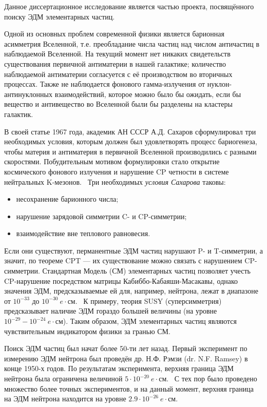 
{\actuality} 
Данное диссертационное исследование является частью проекта, посвящённого поиску ЭДМ элементарных частиц.

Одной из основных проблем современной физики является барионная асимметрия Вселенной, т.е. преобладание числа частиц над числом античастиц в наблюдаемой Вселенной. На текущий момент нет никаких свидетельств существования первичной антиматерии в нашей галактике; количество наблюдаемой антиматерии согласуется с её производством во вторичных процессах. Также не наблюдается фонового гамма-излучения от нуклон-антинуклонных взаимодействий, которое можно было бы ожидать, если бы вещество и антивещество во Вселенной были бы разделены на кластеры галактик.~\cite{Trodden:Baryogenesis} 

В своей статье 1967 года, академик АН СССР А.Д. Сахаров сформулировал три необходимых условия, которым должен был удовлетворять процесс бариогенеза, чтобы материя и антиматерия в первичной Вселенной производились с разными скоростями. Побудительным мотивом формулировки стало открытие космического фонового излучения и нарушение CP четности в системе нейтральных K-мезонов.~\cite{Fitch:Kaon-CP-violation-1964} Три необходимых \emph{условия Сахарова} таковы:
\begin{itemize}
	\item несохранение барионного числа;
	\item нарушение зарядовой симметрии C- и CP-симметрии;
	\item взаимодействие вне теплового равновесия.
\end{itemize}

Если они существуют, перманентные ЭДМ частиц нарушают P- и T-симметрии, а значит, по теореме CPT --- их существование можно связать с нарушением CP-симметрии. Стандартная Модель (СМ) элементарных частиц позволяет учесть CP-нарушение посредством матрицы Кабиббо-Кабаяши-Масакавы, однако значения ЭДМ, предсказываемые ей для, например, нейтрона, лежат в диапазоне от $10^{-33}$ до $10^{-30}~e\cdot$см.~\cite{Harris:Neutron2007} К примеру, теория SUSY (суперсимметрия) предсказывает наличие ЭДМ гораздо большей величины (на уровне $10^{-29} - 10^{-24}~e\cdot$см). Таким образом, ЭДМ элементарных частиц являются чувствительным индикатором физики за гранью СМ. 

Поиск ЭДМ частиц был начат более 50-ти лет назад. Первый эксперимент по измерению ЭДМ нейтрона был проведён др. Н.Ф. Рэмзи (dr. N.F. Ramsey) в конце 1950-х годов. По результатам эксперимента, верхняя граница ЭДМ нейтрона была ограничена величиной $5\cdot 10^{-20}~e\cdot$см.~\cite{Ramsey:Neutron1957} С тех пор было проведено множество более точных экспериментов, и на данный момент, верхняя граница на ЭДМ нейтрона находится на уровне $2.9\cdot 10^{-26}~e\cdot$см.~\cite{Baker:nEDM:Main, Baker:nEDM:Reply}

